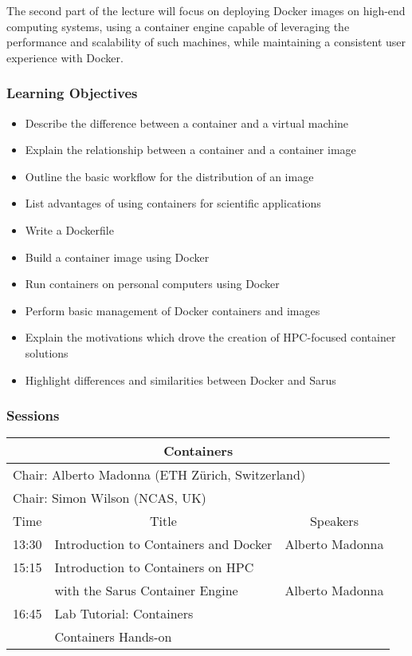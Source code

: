 The second part of the lecture will focus on deploying Docker images on high-end computing systems, using a container engine capable of leveraging the performance and scalability of such machines, while maintaining a consistent user experience with Docker.

\subsubsection{Learning Objectives}

\begin{itemize}

\item Describe the difference between a container and a virtual machine
\item Explain the relationship between a container and a container image
\item Outline the basic workflow for the distribution of an image
\item List advantages of using containers for scientific applications
\item Write a Dockerfile
\item Build a container image using Docker
\item Run containers on personal computers using Docker
\item Perform basic management of Docker containers and images
\item Explain the motivations which drove the creation of HPC-focused container solutions
\item Highlight differences and similarities between Docker and Sarus

\end{itemize}

\subsubsection{Sessions}

\begin{table}[H]
\begin{center}
\begin{tabular}{|l|l|l|}
\hline
\multicolumn{3}{|c|}{\textbf{Containers}} \\ \hline
\multicolumn{3}{|l|}{Chair: Alberto Madonna (ETH Zürich, Switzerland)} \\
\multicolumn{3}{|l|}{Chair: Simon Wilson (NCAS, UK)} \\ \hline \hline
Time & \multicolumn{1}{c|}{Title} & \multicolumn{1}{c|}{Speakers} \\ \hline \hline
13:30 & Introduction to Containers and Docker & Alberto Madonna \\ \hline
15:15 & Introduction to Containers on HPC & \\
      & with the Sarus Container Engine & Alberto Madonna \\ \hline
16:45 & Lab Tutorial: Containers & \\ \hline
      & Containers Hands-on & \\ \hline
\hline
\end{tabular}
\end{center}
\end{table}

